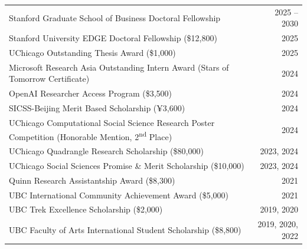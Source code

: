 \documentclass[11pt,letterpaper]{article}
\begin{document}
\noindent
\begin{tabularx}{\textwidth}{Xr}
Stanford Graduate School of Business Doctoral Fellowship & 2025 -- 2030 \\
Stanford University EDGE Doctoral Fellowship (\$12,800) & 2025 \\
UChicago Outstanding Thesis Award (\$1,000) & 2025 \\
Microsoft Research Asia Outstanding Intern Award (Stars of Tomorrow Certificate) & 2024 \\
OpenAI Researcher Access Program (\$3,500) & 2024 \\
SICSS-Beijing Merit Based Scholarship (¥3,600) & 2024 \\
UChicago Computational Social Science Research Poster Competition (Honorable Mention, 2\textsuperscript{nd} Place) & 2024 \\
UChicago Quadrangle Research Scholarship (\$80,000) & 2023, 2024 \\
UChicago Social Sciences Promise \& Merit Scholarship (\$10,000) & 2023, 2024 \\
Quinn Research Assistantship Award (\$8,300) & 2021 \\
UBC International Community Achievement Award (\$5,000) & 2021 \\
UBC Trek Excellence Scholarship (\$2,000) & 2019, 2020 \\
UBC Faculty of Arts International Student Scholarship (\$8,800) & 2019, 2020, 2022 \\
\end{tabularx}
\end{document}

